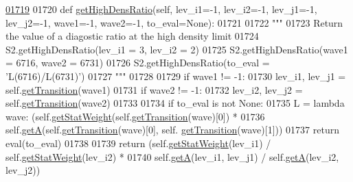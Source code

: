 \begin{DoxyCode}
\hypertarget{classpyneb_1_1core_1_1pynebcore_1_1_atom_l01719}{}\hyperlink{classpyneb_1_1core_1_1pynebcore_1_1_atom_ac2e1509a2acc642c00696f3787e95f95}{01719} 
01720     \textcolor{keyword}{def }\hyperlink{classpyneb_1_1core_1_1pynebcore_1_1_atom_ac2e1509a2acc642c00696f3787e95f95}{getHighDensRatio}(self, lev\_i1=-1, lev\_i2=-1, lev\_j1=-1, lev\_j2=-1, wave1=-1, 
      wave2=-1, to\_eval=None):
01721         
01722         \textcolor{stringliteral}{"""}
01723 \textcolor{stringliteral}{        Return the value of a diagostic ratio at the high density limit}
01724 \textcolor{stringliteral}{        S2.getHighDensRatio(lev\_i1 = 3, lev\_i2 = 2)}
01725 \textcolor{stringliteral}{        S2.getHighDensRatio(wave1 = 6716, wave2 = 6731)}
01726 \textcolor{stringliteral}{        S2.getHighDensRatio(to\_eval = 'L(6716)/L(6731)')}
01727 \textcolor{stringliteral}{        """}
01728         
01729         \textcolor{keywordflow}{if} wave1 != -1:
01730             lev\_i1, lev\_j1 = self.\hyperlink{classpyneb_1_1core_1_1pynebcore_1_1_atom_a7c9f17a3d9e841267add92377d9d1ede}{getTransition}(wave1)
01731         \textcolor{keywordflow}{if} wave2 != -1:
01732             lev\_i2, lev\_j2 = self.\hyperlink{classpyneb_1_1core_1_1pynebcore_1_1_atom_a7c9f17a3d9e841267add92377d9d1ede}{getTransition}(wave2)
01733             
01734         \textcolor{keywordflow}{if} to\_eval \textcolor{keywordflow}{is} \textcolor{keywordflow}{not} \textcolor{keywordtype}{None}:
01735             L = \textcolor{keyword}{lambda} wave: (self.\hyperlink{classpyneb_1_1core_1_1pynebcore_1_1_atom_a0f2483487115f19556586b9e422bd5fb}{getStatWeight}(self.\hyperlink{classpyneb_1_1core_1_1pynebcore_1_1_atom_a7c9f17a3d9e841267add92377d9d1ede}{getTransition}(wave)[0]) * 
01736                               self.\hyperlink{classpyneb_1_1core_1_1pynebcore_1_1_atom_a4b3ea50d7c77fdf645c2cea97243c17e}{getA}(self.\hyperlink{classpyneb_1_1core_1_1pynebcore_1_1_atom_a7c9f17a3d9e841267add92377d9d1ede}{getTransition}(wave)[0], self.
      \hyperlink{classpyneb_1_1core_1_1pynebcore_1_1_atom_a7c9f17a3d9e841267add92377d9d1ede}{getTransition}(wave)[1]))
01737             \textcolor{keywordflow}{return} eval(to\_eval)
01738             
01739         \textcolor{keywordflow}{return} (self.\hyperlink{classpyneb_1_1core_1_1pynebcore_1_1_atom_a0f2483487115f19556586b9e422bd5fb}{getStatWeight}(lev\_i1) / self.\hyperlink{classpyneb_1_1core_1_1pynebcore_1_1_atom_a0f2483487115f19556586b9e422bd5fb}{getStatWeight}(lev\_i2) *
01740                 self.\hyperlink{classpyneb_1_1core_1_1pynebcore_1_1_atom_a4b3ea50d7c77fdf645c2cea97243c17e}{getA}(lev\_i1, lev\_j1) / self.\hyperlink{classpyneb_1_1core_1_1pynebcore_1_1_atom_a4b3ea50d7c77fdf645c2cea97243c17e}{getA}(lev\_i2, lev\_j2))
           
\end{DoxyCode}
